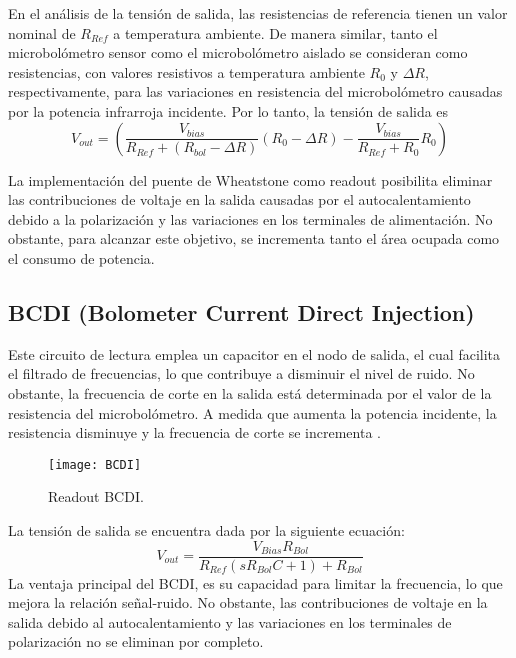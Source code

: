 En el análisis de la tensión de salida, las resistencias de referencia tienen un valor nominal de $R_{Ref}$ a temperatura ambiente. De manera similar, tanto el microbolómetro sensor como el microbolómetro aislado se consideran como resistencias, con valores resistivos a temperatura ambiente $R_{0}$ y $\Delta R$, respectivamente, para las variaciones en resistencia del microbolómetro causadas por la potencia infrarroja incidente. Por lo tanto, la tensión de salida es \cite{BlancoMDA}
        \begin{equation}
        V_{out} =\left(\frac{V_{bias}}{R_{Ref} + (R_{bol} - \Delta R)}(R_{0} - \Delta R)- \frac{V_{bias}}{R_{Ref}+ R_{0}}R_{0} \right)
        \label{eq:Puente}
        \end{equation} 

La implementación del puente de Wheatstone como readout posibilita eliminar las contribuciones de voltaje en la salida causadas por el autocalentamiento debido a la polarización y las variaciones en los terminales de alimentación. No obstante, para alcanzar este objetivo, se incrementa tanto el área ocupada como el consumo de potencia.

\subsection{BCDI (Bolometer Current Direct Injection)}
Este circuito de lectura emplea un capacitor en el nodo de salida, el cual facilita el filtrado de frecuencias, lo que contribuye a disminuir el nivel de ruido. No obstante, la frecuencia de corte en la salida está determinada por el valor de la resistencia del microbolómetro. A medida que aumenta la potencia incidente, la resistencia disminuye y la frecuencia de corte se incrementa \cite{BlancoMDA}.
            \begin{figure}[hbtp]
                \centering
                \texttt{[image: BCDI]}
                \caption{Readout BCDI.}
                \label{fig:BCDI}
            \end{figure}

La tensión de salida se encuentra dada por la siguiente ecuación:
        \begin{equation}
        V_{out} =\frac{V_{Bias} R_{Bol}}{R_{Ref} (sR_{Bol} C+1) + R_{Bol}}
        \label{eq:bcdi}
        \end{equation}
La ventaja principal del BCDI, es su capacidad para limitar la frecuencia, lo que mejora la relación señal-ruido. No obstante, las contribuciones de voltaje en la salida debido al autocalentamiento y las variaciones en los terminales de polarización no se eliminan por completo.
\newpage
